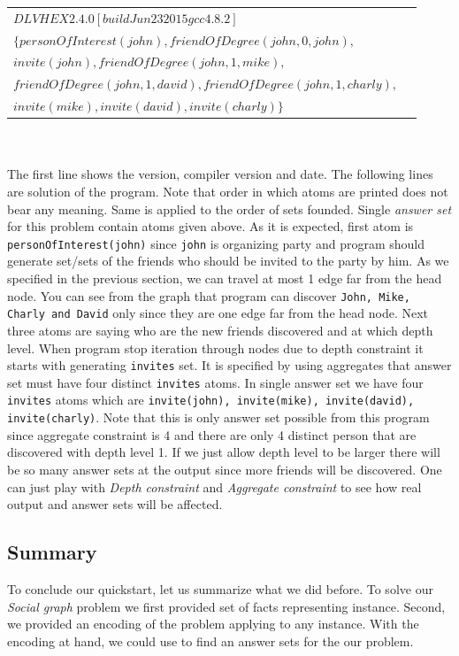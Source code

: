 \documentclass[14pt,a4paper, titlepage]{article}
\begin{document}
\begin{tabular}{ l r }
   $\mathit{ DLVHEX }  \mathit{ 2.4.0 } [ \mathit{ build } \mathit{ Jun } \mathit{ 23 } \mathit{ 2015 }   \mathit{ gcc } \mathit{4.8.2}]$& \\    
   $\mathit{\{personOfInterest(john), friendOfDegree(john,0,john), }$& \\
   $\mathit{invite(john), friendOfDegree(john,1,mike),}$& \\
   $\mathit{friendOfDegree(john,1,david), friendOfDegree(john,1,charly),}$ & \\
   $\mathit{invite(mike),invite(david),invite(charly)\}}$
 \end{tabular}
\\ \\The first line shows the \dlvhex{} version, compiler version and date. The following lines
are solution of the program. Note that order in which atoms are printed does not bear any meaning. 
Same is applied to the order of sets founded. Single \emph{answer set} for this problem contain 
atoms given above. As it is expected, first atom is \texttt{personOfInterest(john)} 
since \texttt{john} is organizing party and program should generate set/sets of the friends 
who should be invited to the party by him. As we specified in the previous section,
we can travel at most 1 edge far from the head node. You can see from the graph that program 
can discover \texttt{John, Mike, Charly and David} only since they are one edge far from the 
head node. Next three atoms are saying who are the new friends discovered and at which depth 
level. When program stop iteration through nodes due to depth constraint it starts with generating 
\texttt{invites} set. It is specified by using aggregates that answer set must have four distinct \texttt{invites} atoms.
In single answer set we have four \texttt{invites} atoms which are \texttt{invite(john), 
invite(mike), invite(david), invite(charly)}. Note that this is only answer set possible 
from this program since aggregate constraint is 4 and there are only 4 distinct person that are discovered with depth level 1. If we just allow depth level to be larger there will be so many answer sets at the output since more friends will be discovered. One can just play with \emph{Depth constraint} and \emph{Aggregate constraint} to see how real output and answer sets will be affected.    
\subsection{Summary}
To conclude our quickstart, let us summarize what we did before. To solve our \emph{Social graph} problem we first provided set of facts representing instance. Second, we provided an encoding of the problem applying to any instance. With the encoding at hand, we could use \dlvhex{} to find an answer sets for the our problem. 
\end{document}
